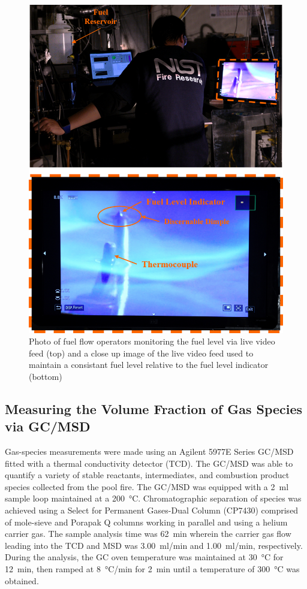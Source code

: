 \documentclass[12pt]{article}
\begin{document}
\begin{figure}[h!]
	\centering
\includegraphics[width=14.0cm,keepaspectratio]{Monitoring_Fuel_Level_A.png}
	\caption[Monitoring Fuel Level]{Photo of fuel flow operators monitoring the fuel level via live video feed (top) and a close up image of the live video feed used to maintain a consistant fuel level relative to the fuel level indicator (bottom)}
	\label{fig:Fuel_Level}
\end{figure}
 
\subsection{Measuring the Volume Fraction of Gas Species via GC/MSD}
\label{ssec:Gas_Species_Setup}

Gas-species measurements were made using an Agilent 5977E Series GC/MSD fitted with a thermal conductivity detector (TCD). The GC/MSD was able to quantify a variety of stable reactants, intermediates, and combustion product species collected from the pool fire. The GC/MSD was equipped with a 2~\si{ml} sample loop maintained at a 200~°\si{C}. Chromatographic separation of species was achieved using a Select for Permanent Gases-Dual Column (CP7430) comprised of mole-sieve and Porapak Q columns working in parallel and using a helium carrier gas. The sample analysis time was 62~\si{min} wherein the carrier gas flow leading into the TCD and MSD was 3.00~\si{ml/min} and 1.00~\si{ml/min}, respectively. During the analysis, the GC oven temperature was maintained at 30~°\si{C} for 12~\si{min}, then ramped at 8~°\si{C}/\si{min} for 2~\si{min} until a temperature of 300~°\si{C} was obtained.
\end{document}
